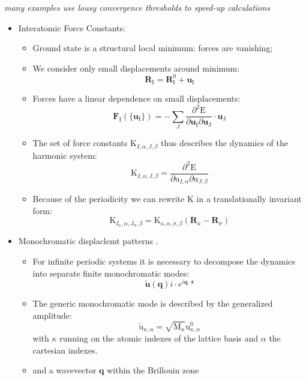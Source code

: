 \documentclass[landscape]{foils}
\begin{document}
{ {\em many examples use lousy convergence
    thresholds to speed-up calculations}}


\begin{itemize} 
\item Interatomic Force Constants: 
	\begin{itemize}
		\item Ground state is a structural local minimum: forces are vanishing; 
		\item We consider only small displacements around minimum:
			$$ \mathrm{\mathbf{R}_I} = \mathrm{\mathbf{R}^0_I} + \mathrm{\mathbf{u}_I} $$ 
	        \item  Forces have a linear dependence on small displacements: 
			$$ \mathrm{\mathbf{F}_I}(\{\mathrm{\mathbf{u}_I}\}) = -\sum_J{
				\frac{\partial^2{\mathrm{E}}}{\partial{\mathrm{\mathbf{u}_I}}\partial{\mathrm{\mathbf{u}_J}}}\cdot \mathrm{\mathbf{u}_J}
			} $$
		\item The set of force constants  $\mathrm{K}_{I,\alpha,J,\beta}$ thus  describes the dynamics of the harmonic system:  
			$$ \mathrm{K}_{I,\alpha,J,\beta}  = \frac{\partial^2{\mathrm{E}}}{\partial{\mathrm{u}_{I,\alpha}}\partial{\mathrm{u}_{J,\beta}}}$$
		\item Because of the periodicity we can rewrite $\mathrm{K}$ in a translationally invariant form:  
			$$ \mathrm{K}_{I_{\kappa},\alpha,J_{\sigma},\beta} = \mathrm{K}_{\kappa,\alpha,\sigma,\beta}(\mathrm{\mathbf{R}}_\kappa-\mathrm{\mathbf{R}}_\sigma)$$ 

	\end{itemize}
\end{itemize}
\begin {itemize}
\item Monochromatic displaclemt patterns . 
	\begin{itemize}
		\item For infinite periodic systems it is necessary to decompose the dynamics into separate finite monochromatic modes: 
			$$ \tilde{\mathrm{\mathbf{u}}}(\mathbf{q}) i\cdot e^{i\mathbf{q}\cdot\mathbf{r}}$$ 	
		\item The generic monochromatic mode is described by the generalized amplitude:  
			$$\tilde{\mathrm{u}}_{\kappa,\alpha} = \sqrt{\mathrm{M}_{\kappa}}\mathrm{u}^0_{\kappa,\alpha} $$ 
			with $\kappa$ running on the atomic indexes of the lattice basis and $\alpha$ the cartesian indexes.
		\item  and a wavevector $\mathrm{\mathbf{q}}$ within the Brillouin zone  
        \end{itemize}
\end{itemize}
\end{document}
